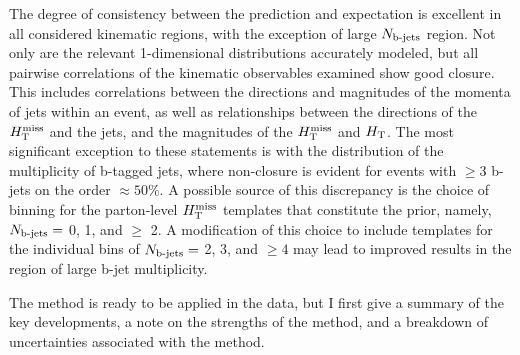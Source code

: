 \noindent
The degree of consistency between the prediction and expectation is excellent in all considered kinematic regions, with the exception of large $N_{\text{b-jets}}$ region. Not only are the relevant 1-dimensional distributions accurately modeled, but all pairwise correlations of the kinematic observables examined show good closure. This includes correlations between the directions and magnitudes of the momenta of jets within an event, as well as relationships between the directions of the $H_{\text{T}}^{\rm miss}$ and the jets, and the magnitudes of the $H_{\text{T}}^{\rm miss}$ and $H_{\rm T}$. The most significant exception to these statements is with the distribution of the multiplicity of b-tagged jets,  where non-closure is evident for events with $\geq 3$ b-jets on the order $\approx50\%$. A possible source of this discrepancy is the choice of binning for the parton-level $H_{\text{T}}^{\rm miss}$ templates that constitute the prior, namely, $N_{\text{b-jets}}=$ 0, 1, and $\geq$ 2.  A modification of this choice to include templates for the individual bins of $N_{\text{b-jets}}=$ 2, 3, and $\geq 4$ may lead to improved results in the region of large b-jet multiplicity. 

The method is ready to be applied in the data, but I first give a summary of the key developments, a note on the strengths of the method, and a breakdown of uncertainties associated with the method.

